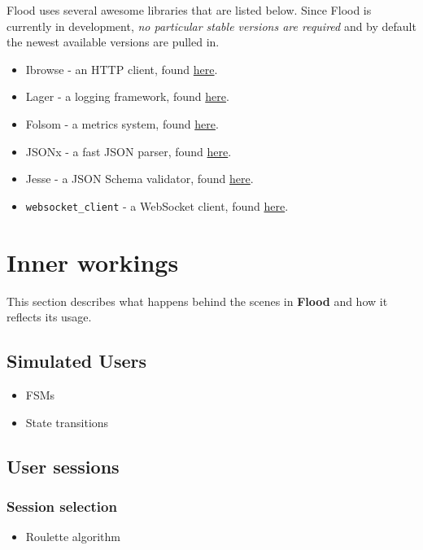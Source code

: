 \documentclass[a4paper]{article}
\begin{document}
Flood uses several awesome libraries that are listed below. Since Flood is currently in development, \emph{no particular stable versions are required} and by default the newest available versions are pulled in.


\begin{itemize}
\item Ibrowse - an HTTP client, found \href{https://github.com/cmullaparthi/ibrowse}{here}.
\item Lager - a logging framework, found \href{https://github.com/basho/lager}{here}.
\item Folsom - a metrics system, found \href{https://github.com/boundary/folsom}{here}.
\item JSONx - a fast JSON parser, found \href{https://github.com/iskra/jsonx}{here}.
\item Jesse - a JSON Schema validator, found \href{https://github.com/alertlogic/jesse}{here}.
\item \texttt{websocket\_client} - a WebSocket client, found \href{https://github.com/jeremyong/websocket_client}{here}.
\end{itemize}

\pagebreak
\section{Inner workings}
\label{sec-2}

This section describes what happens behind the scenes in \textbf{Flood} and how it reflects its usage.
\subsection{Simulated Users}
\label{sec-2-1}


\begin{itemize}
\item FSMs
\item State transitions
\end{itemize}
\subsection{User sessions}
\label{sec-2-2}
\label{ref-sessions}
\subsubsection{Session selection}
\label{sec-2-2-1}


\begin{itemize}
\item Roulette algorithm
\end{itemize}
\end{document}
